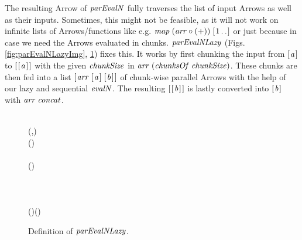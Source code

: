 \documentclass[paper=A4,twoside=true,openright,parskip=full,chapterprefix=true,headings=normal,bibliography=totoc,listof=totoc,titlepage=on,captions=tableabove,draft=false,british]{scrreprt}%
\begin{document}
The resulting Arrow of \ensuremath{\Varid{parEvalN}} fully traverses the list of input
Arrows as well as their inputs. Sometimes, this might not be feasible,
as it will not work on infinite lists of Arrows/functions like e.g.
\ensuremath{\Varid{map}\;(\Varid{arr}\mathbin{\circ}(\mathbin{+}))\;[\mskip1.5mu \mathrm{1}\mathinner{\ldotp\ldotp}\mskip1.5mu]} or just because in case we need the Arrows
evaluated in chunks. \ensuremath{\Varid{parEvalNLazy}} (Figs. \ref{fig:parEvalNLazyImg},
\ref{fig:parEvalNLazy}) fixes this. It works by first chunking the input
from \ensuremath{[\mskip1.5mu \Varid{a}\mskip1.5mu]} to \ensuremath{[\mskip1.5mu [\mskip1.5mu \Varid{a}\mskip1.5mu]\mskip1.5mu]} with the given \ensuremath{\Varid{chunkSize}} in
\ensuremath{\Varid{arr}\;(\Varid{chunksOf}\;\Varid{chunkSize})}. These chunks are then fed into a list
\ensuremath{[\mskip1.5mu \Varid{arr}\;[\mskip1.5mu \Varid{a}\mskip1.5mu]\;[\mskip1.5mu \Varid{b}\mskip1.5mu]\mskip1.5mu]} of chunk-wise parallel Arrows with the help of our lazy
and sequential \ensuremath{\Varid{evalN}}. The resulting \ensuremath{[\mskip1.5mu [\mskip1.5mu \Varid{b}\mskip1.5mu]\mskip1.5mu]} is lastly converted into
\ensuremath{[\mskip1.5mu \Varid{b}\mskip1.5mu]} with \ensuremath{\Varid{arr}\;\Varid{concat}}.

\begin{figure}[h]
\centering
\begin{hscode}\SaveRestoreHook
{}%
%
%
%
\>[B]{}\;\mathrel{=}\<[E]%
\\[\blanklineskip]%
\>[B]{}\mathbin{::}(\;\;\;\;,\;)\Rightarrow {}\<[E]%
\\
\>[B]{}\<[5]%
\>[5]{}\to {}\to (){}\<[E]%
\\
\>[B]{}\;\;\;\mathrel{=}{}\<[E]%
\\
\>[B]{}\<[5]%
\>[5]{}\;(\;)\mathbin{>\!\!>\!\!>}{}\<[E]%
\\
\>[B]{}\<[5]%
\>[5]{}\;\mathbin{>\!\!>\!\!>}{}\<[E]%
\\
\>[B]{}\<[5]%
\>[5]{}\;\<[E]%
\\
\>[B]{}\<[5]%
\>[5]{}\<[E]%
\\
\>[5]{}\<[7]%
\>[7]{}\mathrel{=}\;(\;)\;(\;\;){}\<[E]%
\ColumnHook
\end{hscode}\resethooks
\caption{Definition of \ensuremath{\Varid{parEvalNLazy}}.}\label{fig:parEvalNLazy}\end{figure}
\end{document}
